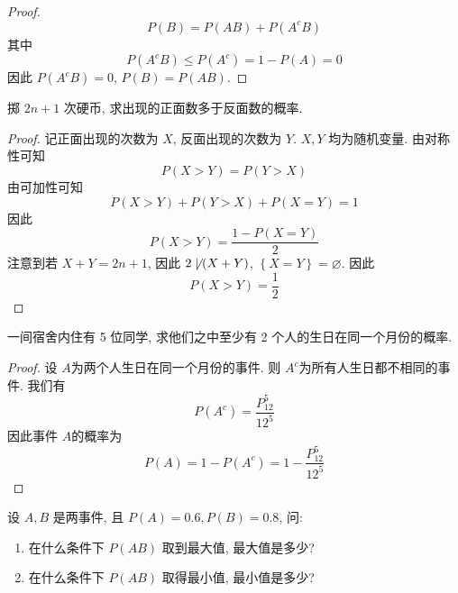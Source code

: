 \documentclass[../main.tex]{subfiles}
\begin{document}
\begin{proof}
   \[
   P\left( B \right)= P\left( AB \right)+ P\left( A^{c}B \right)   
   \]其中 \[
   P\left( A^{c}B \right)\le P\left( A^{c} \right)= 1-P\left( A \right)   = 0
   \]因此 \(  P\left( A^{c}B \right)= 0   \), \(  P\left( B \right)= P\left( AB \right)    \).  
\end{proof}
\begin{exercise}{}{}
掷 $2n+1$ 次硬币, 求出现的正面数多于反面数的概率.
\end{exercise}

\begin{proof}
    记正面出现的次数为 \(  X  \), 反面出现的次数为 \(  Y  \). \(  X,Y  \)   均为随机变量. 由对称性可知 \[
    P\left( X>  Y \right)= P\left( Y>  X \right)  
    \]由可加性可知 \[
    P\left( X>  Y \right)+ P\left( Y> X \right) + P\left( X= Y \right)= 1 
    \]因此 \[
    P\left( X> Y \right) = \frac{1-P\left( X= Y \right)  }{ 2} 
    \]注意到若 \(  X+ Y= 2n+ 1  \), 因此 \(  2\not\mid \left( X+ Y \right)   \), \(  \left\{ X= Y \right\}  = \varnothing\). 因此 \[
    P\left( X> Y \right)= \frac{1 }{2 }  
    \]   
\end{proof}

\begin{exercise}{}{}
一间宿舍内住有 5 位同学, 求他们之中至少有 2 个人的生日在同一个月份的概率.
\end{exercise}

\begin{proof}
    设 \(  A  \)为两个人生日在同一个月份的事件. 则 \(  A^{c}  \)为所有人生日都不相同的事件. 我们有 \[
    P\left( A^{c} \right)= \frac{P_{12}^{5} }{12 ^{5} }
    \]  因此事件 \(  A  \)的概率为 \[
    P\left( A \right)= 1-P\left( A ^{c}\right)= 1-\frac{P_{12}^{5} }{ 12^{5}}   
    \] 
\end{proof}
\begin{exercise}{}{}
设 $A, B$ 是两事件, 且 $P(A) = 0.6, P(B) = 0.8$, 问:
\begin{enumerate}
    \item 在什么条件下 $P(AB)$ 取到最大值, 最大值是多少?
    \item 在什么条件下 $P(AB)$ 取得最小值, 最小值是多少?
\end{enumerate}
\end{exercise}
\end{document}
